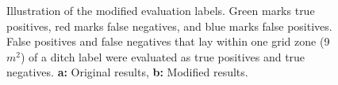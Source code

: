 \documentclass[]{interact}
\theoremstyle{plain}%
\theoremstyle{definition}
\theoremstyle{remark}
\begin{document}
\begin{figure} [!htb]
    \centering
    \hspace{5pt}
    \caption{Illustration of the modified evaluation labels. Green marks true positives, red marks false negatives, and blue marks false positives. False positives and false negatives that lay within one grid zone (9 $m^2$) of a ditch label were evaluated as true positives and true negatives. \textbf{a:} Original results, \textbf{b:} Modified results. }
    \label{fig:newlabels}
\end{figure}
\end{document}
